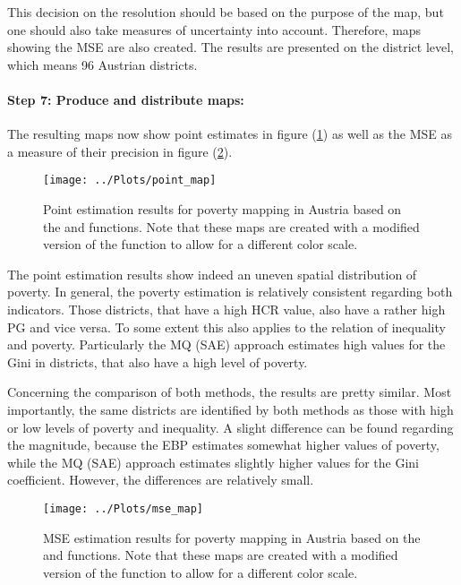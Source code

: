 This decision on the resolution should be based on the purpose of the map, but one should also take measures of uncertainty into account. Therefore, maps showing the MSE are also created. 
The results are presented on the district level, which means 96 Austrian districts. 

\paragraph{Step 7:  Produce and distribute maps:}

The resulting maps now show  point estimates in figure (\ref{Fig:maps}) as well as the MSE as a measure of their precision in figure (\ref{Fig:maps_mse}). 

 \begin{figure}[H]
 \center
\texttt{[image: ../Plots/point\_map]}

\caption[Point estimation results for poverty mapping in Austria based on the  and  functions]{Point estimation results for poverty mapping in Austria based on the  and  functions. Note that these maps are created with a modified version of the  function to allow for a different color scale.}
\label{Fig:maps}
\end{figure}

The point estimation results show indeed an uneven spatial distribution of poverty. In general, the  poverty estimation is relatively consistent regarding both   indicators. Those districts, that have a high HCR value, also have a rather high PG and vice versa. To some extent this also applies to the relation of inequality and poverty. Particularly the MQ (SAE) approach estimates high values for the Gini in districts, that also have a high level of poverty.  

Concerning the comparison of both methods, the results are pretty similar.  Most importantly, the same districts are identified by both methods as those with high or low levels of poverty and inequality. A slight difference can be found regarding the magnitude, because the  EBP estimates somewhat higher values of poverty, while  the MQ (SAE) approach estimates slightly higher values for the Gini coefficient. However, the differences are relatively small. 

 \begin{figure}[H]
\texttt{[image: ../Plots/mse\_map]}
\caption[MSE estimation results for poverty mapping in Austria based on the  and  functions]{MSE estimation results for poverty mapping in Austria based on the  and  functions. Note that these maps are created with a modified version of the  function to allow for a different color scale.}
\label{Fig:maps_mse}
\end{figure}



